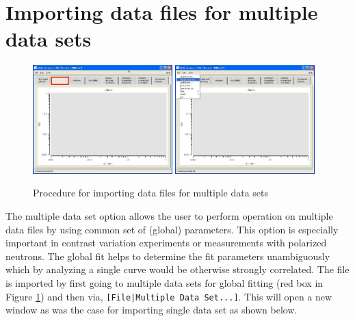 \section{Importing data files for multiple data sets}
\begin{figure}[htb]
\centering
    \includegraphics[width=0.48\textwidth]{QTloadingMultipleDS1.png}
    \hfill
    \includegraphics[width=0.48\textwidth]{QTloadingMultipleDS2.png}
\caption{Procedure for importing data files for multiple data sets}
\label{fig:QTmergeMultipleDS1}
\end{figure}
The multiple data set option allows the user to perform operation on
multiple data files by using common set of (global) parameters. This
option is especially important in contrast variation experiments or
measurements with polarized neutrons. The global fit helps to
determine the fit parameters unambiguously which by analyzing a
single curve would be otherwise strongly correlated. The file is
imported by first going to multiple data sets for global fitting
(red box in Figure \ref{fig:QTmergeMultipleDS1}) and then via,
\verb"[File|Multiple Data Set...]". This will open a new window
as was the case for importing single data set
as shown below.
